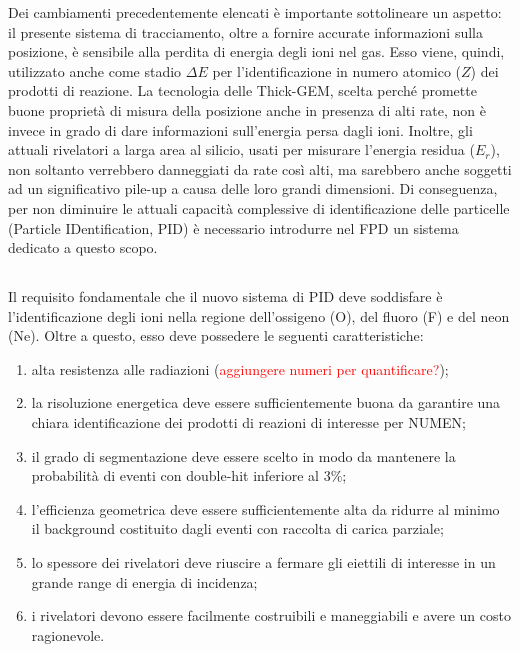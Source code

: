 Dei cambiamenti precedentemente elencati è importante sottolineare un aspetto: il presente sistema di tracciamento, oltre a fornire accurate informazioni sulla posizione, è sensibile alla perdita di energia degli ioni nel gas. Esso viene, quindi, utilizzato anche come stadio $\Delta E$ per l'identificazione in numero atomico ($Z$) dei prodotti di reazione.
La tecnologia delle Thick-GEM, scelta perché promette buone proprietà di misura della posizione anche in presenza di alti rate, non è invece in grado di dare informazioni sull'energia persa dagli ioni.
Inoltre, gli attuali rivelatori a larga area al silicio, usati per misurare l'energia residua ($ E_r $), non soltanto verrebbero danneggiati da rate così alti, ma sarebbero anche soggetti ad un significativo pile-up a causa delle loro grandi dimensioni.
Di conseguenza, per non diminuire le attuali capacità complessive di identificazione delle particelle (Particle IDentification, PID) è necessario introdurre nel FPD un sistema dedicato a questo scopo.



\subsection{}


Il requisito fondamentale che il nuovo sistema di PID deve soddisfare è l'identificazione degli ioni nella regione dell'ossigeno (O), del fluoro (F) e del neon (Ne). 
Oltre a questo, esso deve possedere le seguenti caratteristiche:
\begin{enumerate}
	\item alta resistenza alle radiazioni (\textcolor{red}{aggiungere numeri per quantificare?});
	\item la risoluzione energetica deve essere sufficientemente buona da garantire una chiara identificazione dei prodotti di reazioni di interesse per NUMEN;
	\item il grado di segmentazione deve essere scelto in modo da mantenere la probabilità di eventi con double-hit inferiore al 3\%;
	\item l'efficienza geometrica deve essere sufficientemente alta da ridurre al minimo il background costituito dagli eventi con raccolta di carica parziale;
	\item lo spessore dei rivelatori deve riuscire a fermare gli eiettili di interesse in un grande range di energia di incidenza;
	\item i rivelatori devono essere facilmente costruibili e maneggiabili e avere un costo ragionevole.
\end{enumerate}


